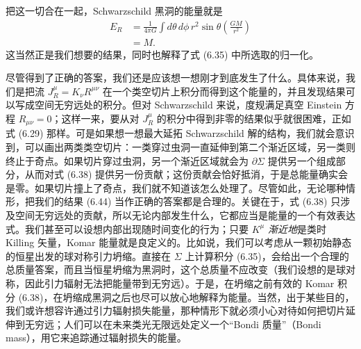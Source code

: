 把这一切合在一起，Schwarzschild 黑洞的能量就是
\begin{align*}
E_{R} &= \frac{1}{4\pi G}\int d\theta\, d\phi\, r^{2}\sin\theta\left(\frac{GM}{r^{2}}\right)\\
&= M.
\tag{6.44}
\end{align*}
这当然正是我们想要的结果，同时也解释了式 (6.35) 中所选取的归一化。

尽管得到了正确的答案，我们还是应该想一想刚才到底发生了什么。具体来说，我们是把流 $J^{\mu}_{R}=K_{\nu}R^{\mu\nu}$ 在一个类空切片上积分而得到这个能量的，并且发现结果可以写成空间无穷远处的积分。但对 Schwarzschild 来说，度规满足真空 Einstein 方程 $R_{\mu\nu}=0$；这样一来，要从对 $J^{\mu}_{R}$ 的积分中得到非零的结果似乎就很困难，正如式 (6.29) 那样。可是如果想一想最大延拓 Schwarzschild 解的结构，我们就会意识到，可以画出两类类空切片：一类穿过虫洞一直延伸到第二个渐近区域，另一类则终止于奇点。如果切片穿过虫洞，另一个渐近区域就会为 $\partial\Sigma$ 提供另一个组成部分，从而对式 (6.38) 提供另一份贡献；这份贡献会恰好抵消，于是总能量确实会是零。如果切片撞上了奇点，我们就不知道该怎么处理了。尽管如此，无论哪种情形，把我们的结果 (6.44) 当作正确的答案都是合理的。关键在于，式 (6.38) 只涉及空间无穷远处的贡献，所以无论内部发生什么，它都应当是能量的一个有效表达式。我们甚至可以设想内部出现随时间变化的行为；只要 $K^{\mu}$ \emph{渐近地}是类时 Killing 矢量，Komar 能量就是良定义的。比如说，我们可以考虑从一颗初始静态的恒星出发的球对称引力坍缩。直接在 $\Sigma$ 上计算积分 (6.35)，会给出一个合理的总质量答案，而且当恒星坍缩为黑洞时，这个总质量不应改变（我们设想的是球对称，因此引力辐射无法把能量带到无穷远）。于是，在坍缩之前有效的 Komar 积分 (6.38)，在坍缩成黑洞之后也尽可以放心地解释为能量。当然，出于某些目的，我们或许想容许通过引力辐射损失能量，那种情形下就必须小心对待如何把切片延伸到无穷远；人们可以在未来类光无限远处定义一个“Bondi 质量”（Bondi mass），用它来追踪通过辐射损失的能量。


